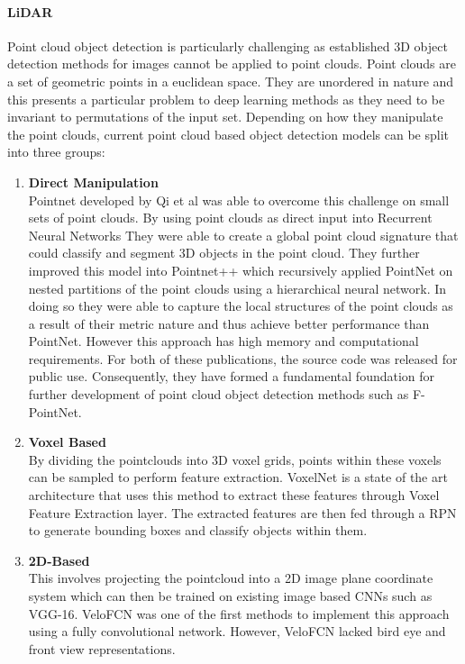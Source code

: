 \paragraph{LiDAR} 
Point cloud object detection is particularly challenging as established 3D object detection methods for images cannot be applied to point clouds. Point clouds are a set of geometric points in a euclidean space. They are unordered in nature and this presents a particular problem to deep learning methods as they need to be invariant to permutations of the input set.
Depending on how they manipulate the point clouds, current point cloud based object detection models can be split into three groups:
\begin{enumerate}
	\item \textbf{Direct Manipulation} \\ 
	Pointnet\cite{qi2017pointnet} developed by Qi et al was able to overcome this challenge on small sets of point clouds. By using point clouds as direct input into Recurrent Neural Networks\cite{medsker2001recurrent} They were able to create a global point cloud signature that could classify and segment 3D objects in the point cloud. They further improved this model into Pointnet++\cite{qi2017pointnet++} which recursively applied PointNet on nested partitions of the point clouds using a hierarchical neural network. In doing so they were able to capture the local structures of the point clouds as a result of their metric nature and thus achieve better performance than PointNet. However this approach has high memory and computational requirements. For both of these publications, the source code was released for public use. Consequently, they have formed a fundamental foundation for further development of point cloud object detection methods such as F-PointNet\cite{qi2017frustum}.
	
	\item \textbf{Voxel Based} \\
	By dividing the pointclouds into 3D voxel grids, points within these voxels can be sampled to perform feature extraction. VoxelNet \cite{zhou2017voxelnet} is a state of the art architecture that uses this method to extract these features through Voxel Feature Extraction layer. The extracted features are then fed through a RPN to generate bounding boxes and classify objects within them. 
	
	\item \textbf{2D-Based }\\
	This involves projecting the pointcloud into a 2D image plane coordinate system which can then be trained on existing image based CNNs  such as VGG-16. VeloFCN \cite{li2016vehicle} was one of the first methods to implement this approach using a fully convolutional network. However, VeloFCN lacked bird eye and front view representations. 
	
\end{enumerate}



